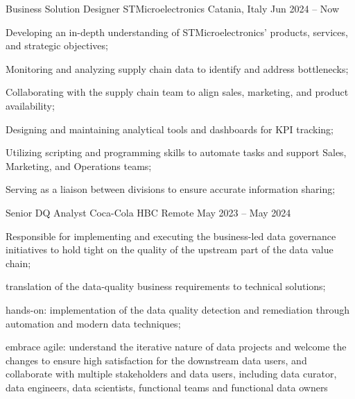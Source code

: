 
  \begin{cventries}
    \cventry
    {Business Solution Designer}
    {STMicroelectronics}
    {Catania, Italy}
    {Jun 2024 -- Now}
    {
      \begin{cvitems}
        \item {Developing an in-depth understanding of STMicroelectronics' products, services, and strategic objectives;}
        \item {Monitoring and analyzing supply chain data to identify and address bottlenecks;}
        \item {Collaborating with the supply chain team to align sales, marketing, and product availability;}
        \item {Designing and maintaining analytical tools and dashboards for KPI tracking;}
        \item {Utilizing scripting and programming skills to automate tasks and support Sales, Marketing, and Operations teams;}
        \item {Serving as a liaison between divisions to ensure accurate information sharing;}
      \end{cvitems}
    }

    \cventry
    {Senior DQ Analyst}
    {Coca-Cola HBC}
    {Remote}
    {May 2023 -- May 2024}
    {
      \begin{cvitems}
        \item{Responsible for implementing and executing the business-led data governance initiatives
        to hold tight on the quality of the upstream part of the data value chain;}
        \item{translation of the data-quality business requirements to technical solutions;}
        \item{hands-on: implementation of the data quality detection and remediation through automation and modern data techniques;}
        \item{
          embrace agile: understand the iterative nature of data projects and welcome the changes to ensure high satisfaction
          for the downstream data users, and collaborate with multiple stakeholders and data users, including data curator, data engineers,
          data scientists, functional teams and functional data owners
        }
      \end{cvitems}
    }


\end{cventries}
